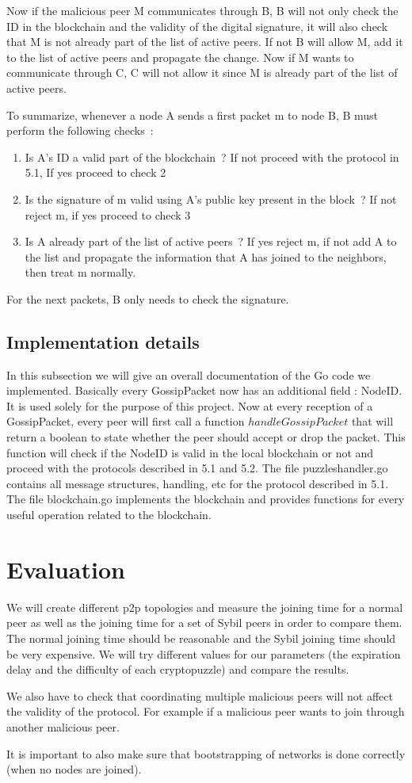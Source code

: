 \documentclass[twocolumn]{article}
\begin{document}
Now if the malicious peer M communicates through B, B will not only check the ID in the blockchain and the validity of the digital signature, it will also check that M is not already part of the list of active peers. If not B will allow M, add it to the list of active peers and propagate the change. Now if M wants to communicate through C, C  will not allow it since M is already part of the list of active peers.

To summarize, whenever a node A sends a first packet m to node B, B must perform the following checks :
\begin{enumerate}
	\item Is A’s ID  a valid part of the blockchain ? If not proceed with the protocol in 5.1, If yes proceed to check 2
	\item Is the signature of m valid using A’s public key present in the block ? If not reject m, if yes proceed to check 3
	\item Is A already part of the list of active peers ? If yes reject m, if not add A to the list and propagate the information that A has joined to the neighbors, then treat m normally.
\end{enumerate}


For the next packets, B only needs to check the signature.

\subsection{Implementation details}
In this subsection we will give an overall documentation of the Go code we implemented. Basically every GossipPacket now has an additional field : NodeID. It is used solely for the purpose of this project. Now at every reception of a GossipPacket, every peer will first call a function $handleGossipPacket$ that will return a boolean to state whether the peer should accept or drop the packet. This function will check if the NodeID is valid in the local blockchain or not and proceed with the protocols described in 5.1 and 5.2. The file puzzleshandler.go contains all message structures, handling, etc for the protocol described in 5.1. The file blockchain.go implements the blockchain and provides functions for every useful operation related to the blockchain.

\section{Evaluation}
We will create different p2p topologies and measure the joining time for a normal peer as well as the joining time for a set of Sybil peers in order to compare them. The normal joining time should be reasonable and the Sybil joining time should be very expensive. We will try different values for our parameters (the expiration delay and the difficulty of each cryptopuzzle) and compare the results.

We also have to check that coordinating multiple malicious peers will not affect the validity of the protocol. For example if a malicious peer wants to join through another malicious peer.

It is important to also make sure that bootstrapping of networks is done correctly (when no nodes are joined).
\printbibliography
\end{document}
